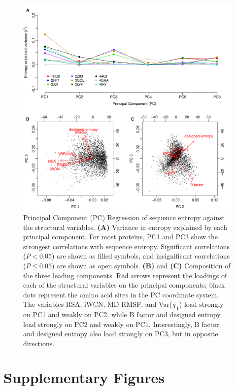 \documentclass[smallextended]{svjour3}
\begin{document}
\begin{figure}[tbh]
\begin{center}
       \includegraphics[width=6.5in]{PC_screen_entropy.pdf}
\end{center}
\caption{Principal Component (PC) Regression of sequence entropy against the structural variables. {\bf (A)} Variance in entropy explained by each principal component. For most proteins, PC1 and PC3 show the strongest correlations with sequence entropy. Significant correlations ($P<0.05$) are shown as filled symbols, and insignificant correlations ($P\leq0.05$) are shown as open symbols. {\bf (B)} and {\bf (C)} Composition of the three leading components. Red arrows represent the loadings of each of the structural variables on the principal components; black dots represent the amino acid sites in the PC coordinate system. The variables RSA, iWCN, MD RMSF, and Var($\chi_1$) load strongly on PC1 and weakly on PC2, while B factor and designed entropy load strongly on PC2 and weakly on PC1. Interestingly, B factor and designed entropy also load strongly on PC3, but in opposite directions.}
\label{fig:cor_entropy_PC_screen}
\end{figure}


\clearpage

\newpage
\section*{Supplementary Figures}
\end{document}
